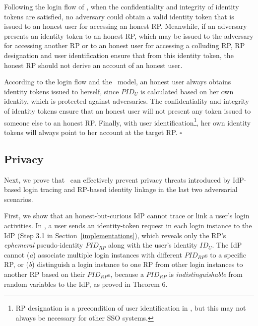 Following the login flow of \usso, when the confidentiality and integrity of identity tokens are satisfied, no adversary could obtain a valid identity token that is issued to an honest user for accessing an honest RP. %
Meanwhile, if an adversary presents an identity token to an honest RP, which may be issued to the adversary for accessing another RP or to an honest user for accessing a colluding RP, RP designation and user identification ensure that from this identity token, the honest RP should not derive an account of an honest user.

According to the login flow and the \dyu~model, an honest user always obtains identity tokens issued to herself, since $PID_U$ is calculated based on her own identity, which is protected against adversaries. The confidentiality and integrity of identity tokens ensure that an honest user will not present any token issued to someone else to an honest RP. Finally, with user identification\footnote{RP designation is a precondition of user identification in \usso, but this may not always be necessary for other SSO systems.}, her own identity tokens will always point to her account at the target RP.
\hfill $\square$


\subsection{Privacy}
\label{sec-:analysis}
Next, we prove that \usso~can effectively prevent privacy threats introduced by IdP-based login tracing and RP-based identity linkage in the last two adversarial scenarios.

\newc 
First, we show that an honest-but-curious IdP cannot trace or link a user's login activities. In \usso, a user sends an identity-token request in each login instance to the IdP (Step 3.1 in Section~\ref{implementations}), which reveals only the RP's \emph{ephemeral} pseudo-identity $PID_{RP}$ along with the user's identity $ID_U$. The IdP cannot (\emph{a}) associate multiple login instances with different $PID_{RP}$s to a specific RP, or (\emph{b}) distinguish a login instance to one RP from other login instances to another RP based on their $PID_{RP}$s, because a $PID_{RP}$ is \emph{indistinguishable} from random variables to the IdP, as proved in Theorem 6.

